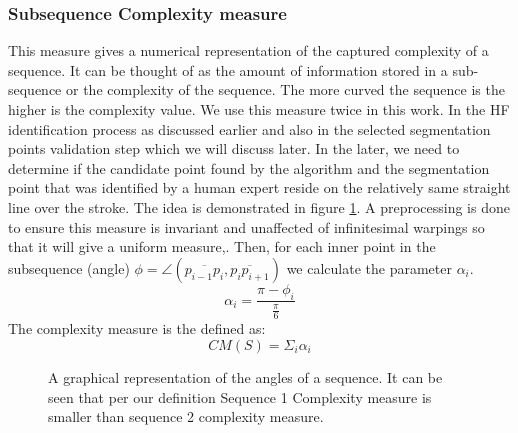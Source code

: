\documentclass[journal,compsoc]{IEEEtran}
\begin{document}
\subsubsection{Subsequence Complexity measure}
\label{subsec:scm}
This measure gives a numerical representation of the captured complexity of a sequence. It can be thought of as the amount of information stored in a sub-sequence or the complexity of the sequence. The more curved the sequence is the higher is the complexity value. We use this measure twice in this work. In the HF identification process as discussed earlier and also in the selected segmentation points validation step which we will discuss later. In the later, we need to determine if the candidate point found by the algorithm and the segmentation point that was identified by a human expert reside on the relatively same straight line over the stroke. The idea is demonstrated in figure \ref{fig:sequence_complexity}.
A preprocessing is done to ensure this measure is invariant and unaffected of infinitesimal warpings so that it will give a uniform measure,. 
Then, for each inner point in the subsequence (angle) $\phi=\angle(\overline{p_{i-1}p_{i}},\overline{p_{i}p_{i+1}})$ we calculate the parameter $\alpha_{i}$.
\begin{equation}
 \alpha_{i}=\frac{\pi-\phi_{i}}{\frac{\pi}{6}}
\end{equation}
The complexity measure is the defined as:
\begin{equation}
CM(S)=\Sigma_{i}\alpha_{i}
\end{equation}

\begin{figure}[h]
     \begin{center}
    \end{center}
    \caption{A graphical representation of the angles of a sequence. It can be seen that per our definition Sequence 1 Complexity measure is smaller than sequence 2 complexity measure.}
   \label{fig:sequence_complexity}
\end{figure}
\end{document}
